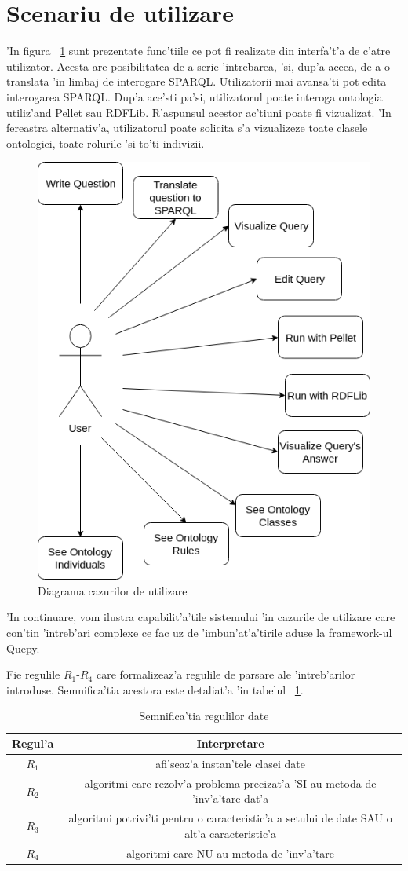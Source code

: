 \documentclass[12pt,a4paper,twoside]{report}
\begin{document}
\section{Scenariu de utilizare}

'In figura ~\ref{fig:usecases} sunt prezentate func'tiile ce pot fi realizate din interfa't'a de c'atre utilizator. Acesta are posibilitatea de a scrie 'intrebarea, 'si, dup'a aceea, de a o translata 'in limbaj de interogare SPARQL. Utilizatorii mai avansa'ti pot edita interogarea SPARQL. Dup'a ace'sti pa'si, utilizatorul poate interoga ontologia utiliz'and Pellet sau RDFLib.  R'aspunsul acestor ac'tiuni poate fi vizualizat. 'In fereastra alternativ'a, utilizatorul poate solicita s'a vizualizeze toate clasele ontologiei, toate rolurile 'si to'ti indivizii.


\begin{figure}
    \centering
    \includegraphics[width = 0.55 \linewidth]{img/use_case.png}
        \caption{Diagrama cazurilor de utilizare}
    \label{fig:usecases}
\end{figure}

'In continuare, vom ilustra capabilit'a'tile sistemului 'in cazurile de utilizare care con'tin 'intreb'ari complexe ce fac uz de 'imbun'at'a'tirile aduse la framework-ul Quepy.

Fie regulile $R_1$-$R_4$ care formalizeaz'a regulile de parsare ale 'intreb'arilor introduse. Semnifica'tia acestora este detaliat'a 'in tabelul ~\ref{tab:rules}.

\begin{table}[]
    \centering
    \begin{tabular}{|c|c|}
    \hline \hline
      Regul'a & Interpretare\\[0.5ex] \hline 
     $R_1$ & afi'seaz'a instan'tele clasei date \\[1ex]
  $R_2$ & algoritmi care rezolv'a problema precizat'a 'SI au metoda de 'inv'a'tare dat'a\\[1ex]
  $R_3$ & algoritmi potrivi'ti pentru o caracteristic'a a setului de date SAU o alt'a caracteristic'a\\[1ex]
  $R_4$ & algoritmi care NU au metoda de 'inv'a'tare \\[1ex]
  \hline
    \end{tabular}
    \caption{Semnifica'tia regulilor date}
    \label{tab:rules}
\end{table}
\end{document}
